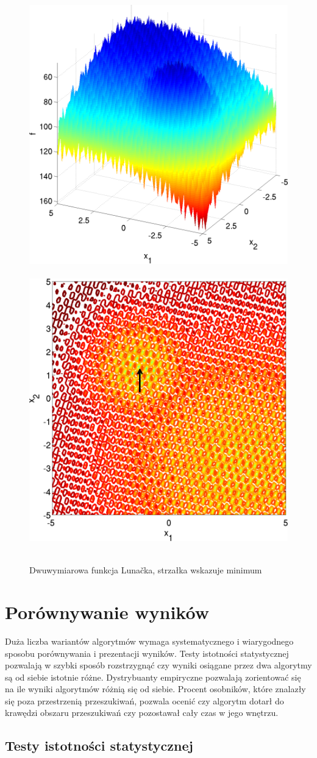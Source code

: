 \documentclass[a4paper,onecolumn,oneside,12pt,wide,floatssmall]{mwrep}
\theoremstyle{definition}
\theoremstyle{plain}%
\theoremstyle{remark}
\begin{document}
\begin{figure}[H]
\centering
\mbox{
\includegraphics[width=.45\textwidth]{img/24.png} \quad
\includegraphics[width=.45\textwidth]{img/24a.png} 
}
\caption{Dwuwymiarowa funkcja Lunačka, strzałka wskazuje minimum \cite{noiseless}}
\end{figure}

\section{Porównywanie wyników}

Duża liczba wariantów algorytmów wymaga systematycznego i wiarygodnego sposobu porównywania
i prezentacji wyników. Testy istotności statystycznej pozwalają w szybki sposób rozstrzygnąć czy 
wyniki osiągane przez dwa algorytmy są od siebie istotnie różne. Dystrybuanty empiryczne
pozwalają zorientować się na ile wyniki algorytmów różnią się od siebie. Procent osobników, które
znalazły się poza przestrzenią przeszukiwań, pozwala ocenić czy algorytm dotarł do krawędzi
obszaru przeszukiwań czy pozostawał cały czas w jego wnętrzu.

\subsection{Testy istotności statystycznej}
\label{section:testy_istotnosci}
\end{document}
